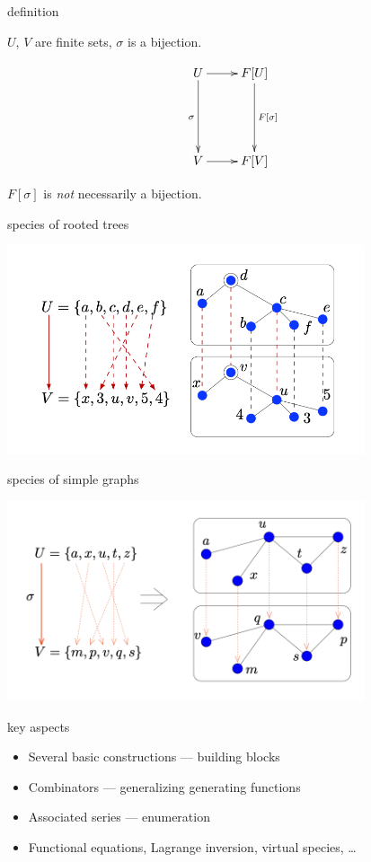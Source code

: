 \documentclass{beamer}
\begin{document}
\begin{frame}{definition}

  $U$, $V$ are finite sets, $\sigma$ is a bijection.

  \[
    \xymatrix{U \ar[dd]_\sigma \ar[r] &  F[U] \ar[dd]^{F[\sigma]} \\ & \\
    V \ar[r] &  F[V]}
  \] \pause

  $F[\sigma]$ is \emph{not} necessarily a bijection.

\end{frame}

\begin{frame}{species of rooted trees}
  \begin{center}
    \includegraphics[width=10.5cm]{figures/tree_aut.png}
  \end{center}
\end{frame}

\begin{frame}{species of simple graphs}
  \begin{center}
    \includegraphics[width=10.5cm]{figures/graph_aut.png}
  \end{center}
\end{frame}

\begin{frame}{key aspects}
  \begin{itemize}
    \item Several basic constructions --- building blocks
    \item Combinators --- generalizing generating functions
    \item Associated series --- enumeration
    \item Functional equations, Lagrange inversion, virtual species, \ldots
  \end{itemize}
\end{frame}
\end{document}
